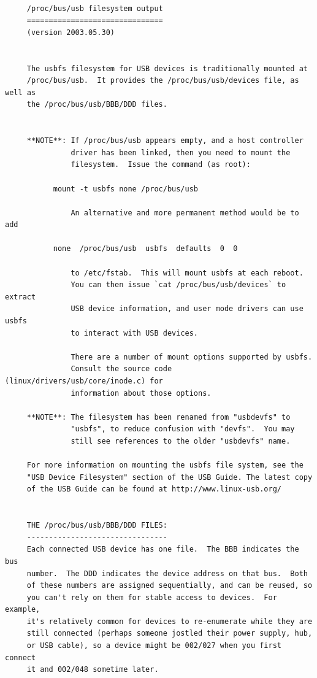 \footnotesize
\begin{verbatim}
     
     /proc/bus/usb filesystem output
     ===============================
     (version 2003.05.30)
     
     
     The usbfs filesystem for USB devices is traditionally mounted at
     /proc/bus/usb.  It provides the /proc/bus/usb/devices file, as well as
     the /proc/bus/usb/BBB/DDD files.
     
     
     **NOTE**: If /proc/bus/usb appears empty, and a host controller
               driver has been linked, then you need to mount the
               filesystem.  Issue the command (as root):
     
           mount -t usbfs none /proc/bus/usb
     
               An alternative and more permanent method would be to add
     
           none  /proc/bus/usb  usbfs  defaults  0  0
     
               to /etc/fstab.  This will mount usbfs at each reboot.
               You can then issue `cat /proc/bus/usb/devices` to extract
               USB device information, and user mode drivers can use usbfs
               to interact with USB devices.
     
               There are a number of mount options supported by usbfs.
               Consult the source code (linux/drivers/usb/core/inode.c) for
               information about those options.
     
     **NOTE**: The filesystem has been renamed from "usbdevfs" to
               "usbfs", to reduce confusion with "devfs".  You may
               still see references to the older "usbdevfs" name.
     
     For more information on mounting the usbfs file system, see the
     "USB Device Filesystem" section of the USB Guide. The latest copy
     of the USB Guide can be found at http://www.linux-usb.org/
     
     
     THE /proc/bus/usb/BBB/DDD FILES:
     --------------------------------
     Each connected USB device has one file.  The BBB indicates the bus
     number.  The DDD indicates the device address on that bus.  Both
     of these numbers are assigned sequentially, and can be reused, so
     you can't rely on them for stable access to devices.  For example,
     it's relatively common for devices to re-enumerate while they are
     still connected (perhaps someone jostled their power supply, hub,
     or USB cable), so a device might be 002/027 when you first connect
     it and 002/048 sometime later.
     

\end{verbatim}
